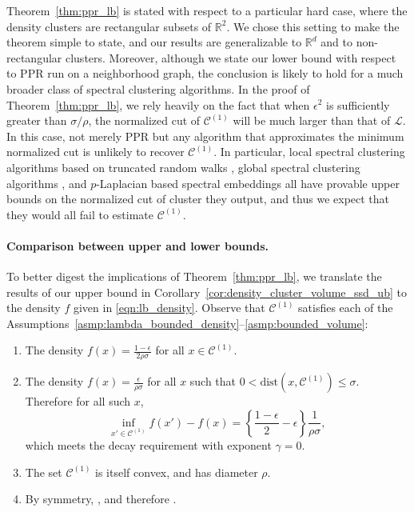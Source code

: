 \documentclass[11pt,twoside]{article}
\newcommand{\Reals}{\mathbb{R}}
\newcommand{\1}{\mathbf{1}}
\newcommand{\mc}[1]{\mathcal{#1}}
\newcommand{\Pbb}{\mathbb{P}}
\newcommand{\dist}{\mathrm{dist}}
\newcommand{\vol}{\mathrm{vol}}
\begin{document}
Theorem~\ref{thm:ppr_lb} is stated with respect to a particular hard case, where
the density clusters are rectangular subsets of $\Reals^2$.  We chose this
setting to make the theorem simple to state, and our results are generalizable
to $\Reals^d$ and to non-rectangular clusters.  Moreover, although we state
our lower bound with respect to PPR run on a neighborhood graph, the conclusion is
likely to hold for a much broader class of spectral clustering algorithms. In
the proof of Theorem~\ref{thm:ppr_lb}, we rely heavily on the fact that when
$\epsilon^2$ is sufficiently greater than $\sigma/\rho$, the normalized cut of
$\mc{C}^{(1)}$ will be much larger than that of $\mathcal{L}$. In this case, not
merely PPR but any algorithm that approximates the minimum normalized cut is
unlikely to recover $\mc{C}^{(1)}$. In particular, local spectral clustering
algorithms based on truncated random walks \citep{spielman2013}, global spectral
clustering algorithms \citep{shi00}, and $p$-Laplacian based spectral embeddings
\citep{hein2010} all have provable upper bounds on the normalized cut of cluster
they output, and thus we expect that they would all fail to estimate
$\mc{C}^{(1)}$.

\paragraph{Comparison between upper and lower bounds.}

To better digest the implications of Theorem~\ref{thm:ppr_lb}, we translate the
results of our upper bound in Corollary~\ref{cor:density_cluster_volume_ssd_ub} to the density $f$ given in \eqref{eqn:lb_density}. Observe that $\mc{C}^{(1)}$ satisfies each of the Assumptions~\ref{asmp:lambda_bounded_density}--\ref{asmp:bounded_volume}:

\begin{enumerate}[label=(A\arabic*)]
	\item The density $f(x) = \frac{1 - \epsilon}{2 \rho \sigma}$ for all $x \in
	\mc{C}^{(1)}$.  
	\item The density $f(x) = \frac{\epsilon}{\rho\sigma}$ for all $x$ such
	that $0 < \dist(x,\mc{C}^{(1)}) \leq \sigma$. Therefore for all such $x$, 
	$$
	\inf_{x' \in \mc{C}^{(1)}} f(x') - f(x)  = \left\{\frac{1 - \epsilon}{2} -
	\epsilon \right\} \frac{1}{\rho \sigma},
	$$
	which meets the decay requirement with exponent $\gamma=0$.
	\item The set $\mc{C}^{(1)}$ is itself convex, and has diameter $\rho$.
	\item By symmetry, \smash{$\vol_{\Pbb,r}(\mc{C}^{(1)}) =
		\vol_{\Pbb,r}(\mc{C}^{(2)})$}, and therefore
	\smash{$\vol_{\Pbb,r}(\mc{C}^{(1)}) \leq \frac{1}{2}\vol_{\Pbb,r}(\Reals^d)$}.   
\end{enumerate}
\end{document}
